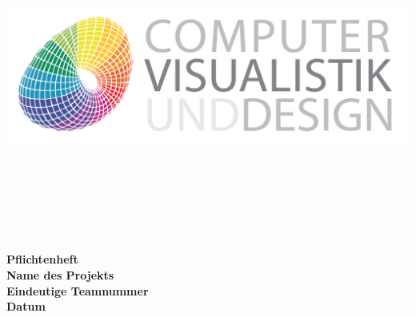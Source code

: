 \documentclass[12pt]{article}
\begin{document}

\begin{titlepage}

        
        \begin{center}
        \includegraphics[scale=0.15, keepaspectratio=true]{data/fig/CVD_Logo.png}
        \end{center}
        
       

        
        \begin{center}
            
            
            {\huge \bfseries
            		\ \\
            		\ \\
            		\ \\
            		\ \\
            		\ \\
            		\ \\
                Pflichtenheft\\
				Name des Projekts\\
				Eindeutige Teamnummer\\
				Datum\\
				\ \\
				\ \\
			
            }
            
		\end{center}


\end{titlepage}

\end{document}
